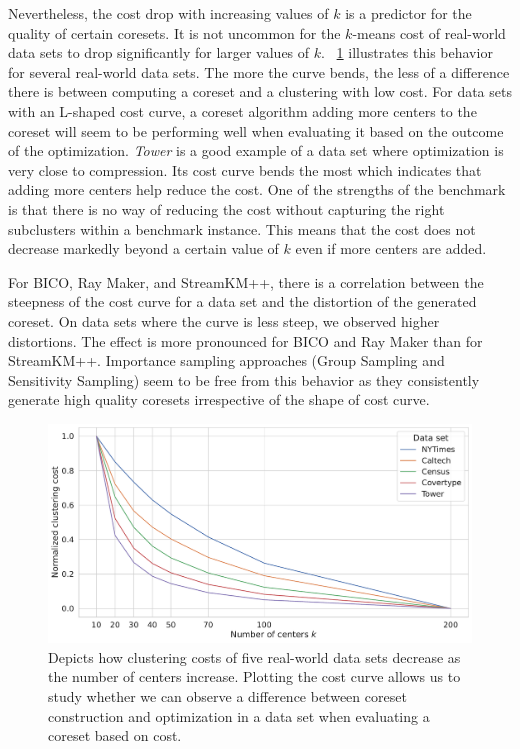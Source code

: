 Nevertheless, the cost drop with increasing values of $k$ is a predictor for the quality of certain coresets. It is not uncommon for the $k$-means cost of real-world data sets to drop significantly for larger values of $k$.
~\cref{fig:cost-curves-real-world-datasets} illustrates this behavior for several real-world data sets. The more the curve bends, the less of a difference there is between computing a coreset and a clustering with low cost. For data sets with an L-shaped cost curve, a coreset algorithm adding more centers to the coreset will seem to be performing well when evaluating it based on the outcome of the optimization.
\textit{Tower} is a good example of a data set where optimization is very close to compression. Its cost curve bends the most which indicates that adding more centers help reduce the cost. One of the strengths of the benchmark is that there is no way of reducing the cost without capturing the right subclusters within a benchmark instance. This means that the cost does not decrease markedly beyond a certain value of $k$ even if more centers are added.

For BICO, Ray Maker, and StreamKM++, there is a correlation between the steepness of the cost curve for a data set and the distortion of the generated coreset. 
On data sets where the curve is less steep, we observed higher distortions. The effect is more pronounced for BICO and Ray Maker than for StreamKM++. Importance sampling approaches (Group Sampling and Sensitivity Sampling) seem to be free from this behavior as they consistently generate high quality coresets irrespective of the shape of cost curve.







\begin{figure}
  \centering
  \includegraphics[width=1\linewidth]{figures/cost-curves-real-world-datasets.pdf}
  \caption{Depicts how clustering costs of five real-world data sets decrease as the number of centers increase. 
  Plotting the cost curve allows us to study whether we can observe a difference between coreset construction and optimization in a data set when evaluating a coreset based on cost.
  }
  \label{fig:cost-curves-real-world-datasets}
\end{figure}



